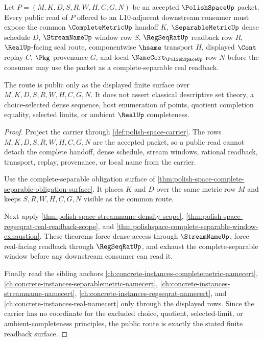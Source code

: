 \begin{theorem}
\label{thm:polishspace-public-complete-separable-real-readback}
Let $P=(M,K,D,S,R,W,H,C,G,N)$ be an accepted $\PolishSpaceUp$ packet. Every public read of $P$ offered to an L10-adjacent downstream consumer must expose the common $\CompleteMetricUp$ handoff $K$, $\SeparableMetricUp$ dense schedule $D$, $\StreamNameUp$ window row $S$, $\RegSeqRatUp$ readback row $R$, $\RealUp$-facing seal route, componentwise $\hsame$ transport $H$, displayed $\Cont$ replay $C$, $\Pkg$ provenance $G$, and local $\NameCert_{\PolishSpaceUp}$ row $N$ before the consumer may use the packet as a complete-separable real readback.

The route is public only as the displayed finite surface over $M,K,D,S,R,W,H,C,G,N$. It does not assert classical descriptive set theory, a choice-selected dense sequence, host enumeration of points, quotient completion equality, selected limits, or ambient $\RealUp$ completeness.
\end{theorem}
\begin{proof}
Project the carrier through \autoref{def:polish-space-carrier}. The rows $M,K,D,S,R,W,H,C,G,N$ are the accepted packet, so a public read cannot detach the complete handoff, dense schedule, stream windows, rational readback, transport, replay, provenance, or local name from the carrier.

Use the complete-separable obligation surface of \autoref{thm:polish-space-complete-separable-obligation-surface}. It places $K$ and $D$ over the same metric row $M$ and keeps $S,R,W,H,C,G,N$ visible as the common route.

Next apply \autoref{thm:polish-space-streamname-density-scope}, \autoref{thm:polish-space-regseqrat-real-readback-scope}, and \autoref{thm:polishspace-complete-separable-window-exhaustion}. These theorems force dense access through $\StreamNameUp$, force real-facing readback through $\RegSeqRatUp$, and exhaust the complete-separable window before any downstream consumer can read it.

Finally read the sibling anchors \autoref{ch:concrete-instances-completemetric-namecert}, \autoref{ch:concrete-instances-separablemetric-namecert}, \autoref{ch:concrete-instances-streamname-namecert}, \autoref{ch:concrete-instances-regseqrat-namecert}, and \autoref{ch:concrete-instances-real-namecert} only through the displayed rows. Since the carrier has no coordinate for the excluded choice, quotient, selected-limit, or ambient-completeness principles, the public route is exactly the stated finite readback surface.
\end{proof}

